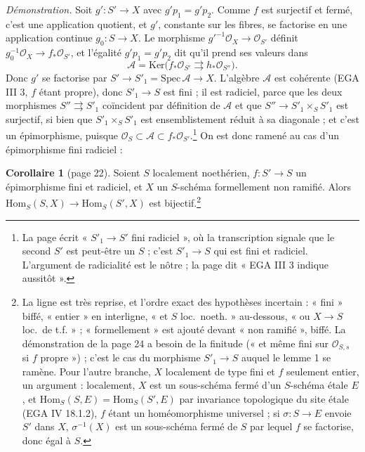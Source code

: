 \documentclass[11pt,a4paper]{article}
\begin{document}
\emph{Démonstration.} Soit $g' : S' \to X$ avec $g' p_1 = g' p_2$. Comme $f$
est surjectif et fermé, c'est une application quotient, et $g'$, constante
sur les fibres, se factorise en une application continue $g_0 : S \to X$. Le
morphisme $g'^{-1}\mathcal{O}_X \to \mathcal{O}_{S'}$ définit
$g_0^{-1}\mathcal{O}_X \to f_*\mathcal{O}_{S'}$, et l'égalité
$g' p_1 = g' p_2$ dit qu'il prend ses valeurs dans
\[
  \mathcal{A} = \mathrm{Ker}\bigl(f_*\mathcal{O}_{S'} \rightrightarrows
  h_*\mathcal{O}_{S''}\bigr).
\]
Donc $g'$ se factorise par $S' \to S'_1 = \mathrm{Spec}\,\mathcal{A} \to X$.
L'algèbre $\mathcal{A}$ est cohérente (EGA III 3, $f$ étant propre), donc
$S'_1 \to S$ est fini ; il est radiciel, parce que les deux morphismes
$S'' \rightrightarrows S'_1$ coïncident par définition de $\mathcal{A}$ et que
$S'' \to S'_1 \times_S S'_1$ est surjectif, si bien que $S'_1 \times_S S'_1$
est ensemblistement réduit à sa diagonale ; et c'est un épimorphisme, puisque
$\mathcal{O}_S \subset \mathcal{A} \subset f_*\mathcal{O}_{S'}$.\footnote{La
page écrit « $S'_1 \to S'$ fini radiciel », où la transcription signale que
le second $S'$ est peut-être un $S$ ; c'est $S'_1 \to S$ qui est fini et
radiciel. L'argument de radicialité est le nôtre ; la page dit « EGA III 3
indique aussitôt ».} On est donc ramené au cas d'un épimorphisme fini
radiciel :

\textbf{Corollaire 1} (page 22). Soient $S$ localement noethérien,
$f : S' \to S$ un épimorphisme fini et radiciel, et $X$ un $S$-schéma
formellement non ramifié. Alors $\mathrm{Hom}_S(S, X) \to \mathrm{Hom}_S(S',
X)$ est bijectif.\footnote{La ligne est très reprise, et l'ordre exact des
hypothèses incertain : « fini » biffé, « entier » en interligne, « et $S$
loc.\ noeth. » au-dessous, « ou $X \to S$ loc.\ de t.f. » ; « formellement »
est ajouté devant « non ramifié », biffé. La démonstration de la page 24 a
besoin de la finitude (« et même fini sur $\mathcal{O}_{S,s}$ si $f$
propre ») ; c'est le cas du morphisme $S'_1 \to S$ auquel le lemme 1 se
ramène. Pour l'autre branche, $X$ localement de type fini et $f$ seulement
entier, un argument : localement, $X$ est un sous-schéma fermé d'un
$S$-schéma étale $E$, et $\mathrm{Hom}_S(S, E) = \mathrm{Hom}_S(S', E)$ par
invariance topologique du site étale (EGA IV 18.1.2), $f$ étant un
homéomorphisme universel ; si $\sigma : S \to E$ envoie $S'$ dans $X$,
$\sigma^{-1}(X)$ est un sous-schéma fermé de $S$ par lequel $f$ se
factorise, donc égal à $S$.}
\end{document}
